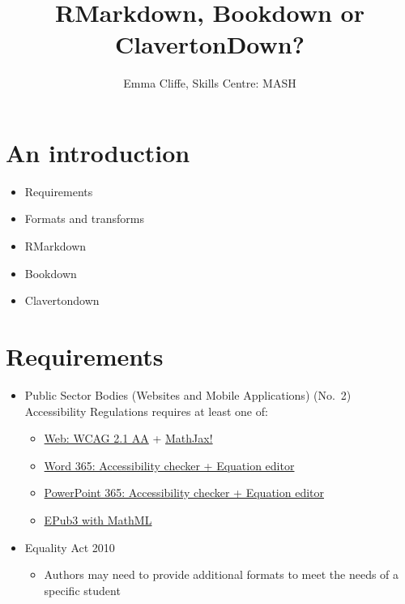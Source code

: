 \documentclass[
  10pt,
  a4paper]{article}
\title{RMarkdown, Bookdown or ClavertonDown?}
\author{Emma Cliffe, Skills Centre: MASH}
\date{}
\providecommand{\tightlist}{%
  \setlength{\itemsep}{0pt}\setlength{\parskip}{0pt}}
\begin{document}
\maketitle

{
\hypersetup{linkcolor=}
\setcounter{tocdepth}{2}
\tableofcontents
}
\newpage
{}

\hypertarget{an-introduction}{%
\section*{An introduction}\label{an-introduction}}

\begin{itemize}
\tightlist
\item
  Requirements
\item
  Formats and transforms
\item
  RMarkdown
\item
  Bookdown
\item
  Clavertondown
\end{itemize}

\hypertarget{requirements}{%
\section{Requirements}\label{requirements}}

\begin{itemize}
\tightlist
\item
  Public Sector Bodies (Websites and Mobile Applications) (No.~2) Accessibility Regulations requires at least one of:

  \begin{itemize}
  \tightlist
  \item
    \href{https://accessibilityinsights.io/docs/en/web/overview}{Web: WCAG 2.1 AA} + \href{https://docs.mathjax.org/en/v2.7-latest/misc/accessibility-features.html}{MathJax!}
  \item
    \href{https://support.office.com/en-gb/article/make-your-word-documents-accessible-to-people-with-disabilities-d9bf3683-87ac-47ea-b91a-78dcacb3c66d}{Word 365: Accessibility checker + Equation editor}
  \item
    \href{https://support.microsoft.com/en-us/office/make-your-powerpoint-presentations-accessible-to-people-with-disabilities-6f7772b2-2f33-4bd2-8ca7-dae3b2b3ef25}{PowerPoint 365: Accessibility checker + Equation editor}
  \item
    \href{https://docs.mathjax.org/en/v2.7-latest/misc/epub.html}{EPub3 with MathML}
  \end{itemize}
\item
  Equality Act 2010

  \begin{itemize}
  \tightlist
  \item
    Authors may need to provide additional formats to meet the needs of a specific student
  \end{itemize}
\end{itemize}
\end{document}

